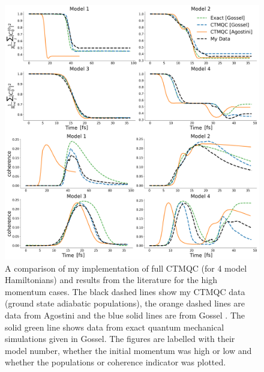 \begin{figure}[ht]
	\includegraphics[width=\textwidth]{../img/CTMQC/TullyModels/CTMQC_highMom.png}
	\caption{\label{fig:LitCompCTMQCTullyHigh}A comparison of my implementation of full CTMQC (for 4 model Hamiltonians) and results from the literature for the high momentum cases. The black dashed lines show my CTMQC data (ground state adiabatic populations), the orange dashed lines are data from Agostini \cite{agostini_quantum-classical_2016} and the blue solid lines are from Gossel \cite{gossel_coupled-trajectory_2018}. The solid green line shows data from exact quantum mechanical simulations given in Gossel. The figures are labelled with their model number, whether the initial momentum was high or low and whether the populations or coherence indicator was plotted.}
\end{figure}

